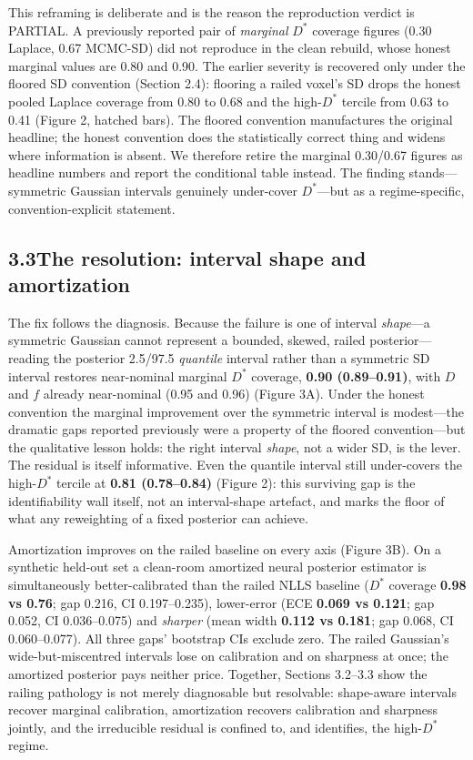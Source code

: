 \documentclass[11pt]{article}
\newcommand{\Dstar}{\ensuremath{D^{*}}}
\begin{document}
This reframing is deliberate and is the reason the reproduction verdict is PARTIAL. A
previously reported pair of \emph{marginal} \Dstar{} coverage figures (0.30 Laplace,
0.67 MCMC-SD) did not reproduce in the clean rebuild, whose honest marginal values are
0.80 and 0.90. The earlier severity is recovered only under the floored SD convention
(Section 2.4): flooring a railed voxel's SD drops the honest pooled Laplace coverage from
0.80 to 0.68 and the high-\Dstar{} tercile from 0.63 to 0.41 (Figure 2, hatched bars).
The floored convention manufactures the original headline; the honest convention does the
statistically correct thing and widens where information is absent. We therefore retire
the marginal 0.30/0.67 figures as headline numbers and report the conditional table
instead. The finding stands---symmetric Gaussian intervals genuinely under-cover
\Dstar{}---but as a regime-specific, convention-explicit statement.

\subsection*{3.3\quad The resolution: interval shape and amortization}

The fix follows the diagnosis. Because the failure is one of interval \emph{shape}---a
symmetric Gaussian cannot represent a bounded, skewed, railed posterior---reading the
posterior 2.5/97.5 \emph{quantile} interval rather than a symmetric SD interval restores
near-nominal marginal \Dstar{} coverage, \textbf{0.90 (0.89--0.91)}, with $D$ and $f$
already near-nominal (0.95 and 0.96) (Figure 3A). Under the honest convention the
marginal improvement over the symmetric interval is modest---the dramatic gaps reported
previously were a property of the floored convention---but the qualitative lesson holds:
the right interval \emph{shape}, not a wider SD, is the lever. The residual is itself
informative. Even the quantile interval still under-covers the high-\Dstar{} tercile at
\textbf{0.81 (0.78--0.84)} (Figure 2): this surviving gap is the identifiability wall
itself, not an interval-shape artefact, and marks the floor of what any reweighting of a
fixed posterior can achieve.

Amortization improves on the railed baseline on every axis (Figure 3B). On a synthetic
held-out set a clean-room amortized neural posterior estimator is simultaneously
better-calibrated than the railed NLLS baseline (\Dstar{} coverage \textbf{0.98 vs
0.76}; gap 0.216, CI 0.197--0.235), lower-error (ECE \textbf{0.069 vs 0.121}; gap 0.052,
CI 0.036--0.075) and \emph{sharper} (mean width \textbf{0.112 vs 0.181}; gap 0.068, CI
0.060--0.077). All three gaps' bootstrap CIs exclude zero. The railed Gaussian's
wide-but-miscentred intervals lose on calibration and on sharpness at once; the amortized
posterior pays neither price. Together, Sections 3.2--3.3 show the railing pathology is
not merely diagnosable but resolvable: shape-aware intervals recover marginal
calibration, amortization recovers calibration and sharpness jointly, and the irreducible
residual is confined to, and identifies, the high-\Dstar{} regime.
\end{document}
